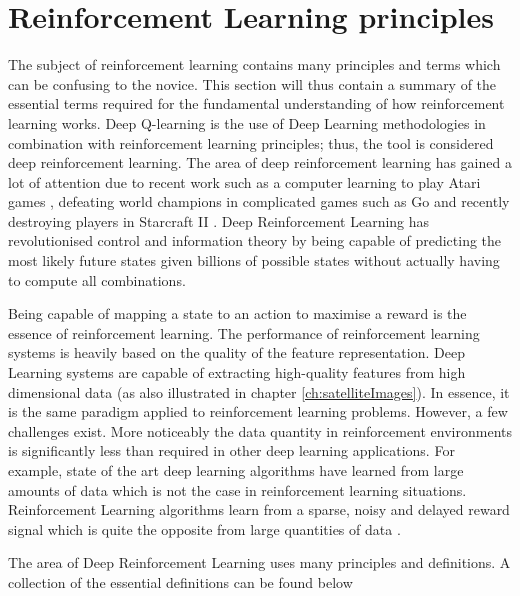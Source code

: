 \section{Reinforcement Learning principles}\label{sec:reinforcement_learning_principles}
The subject of reinforcement learning contains many principles and terms which can be confusing to the novice. This section will thus contain a summary of the essential terms required for the fundamental understanding of how reinforcement learning works. Deep Q-learning is the use of Deep Learning methodologies in combination with reinforcement learning principles; thus, the tool is considered deep reinforcement learning. The area of deep reinforcement learning has gained a lot of attention due to recent work such as a computer learning to play Atari games \cite{MnihPlayingLearning}, defeating world champions in complicated games such as Go \cite{Silver2016MasteringSearch} and recently destroying players in Starcraft II \cite{Vinyals2019GrandmasterLearning}. Deep Reinforcement Learning has revolutionised control and information theory by being capable of predicting the most likely future states given billions of possible states without actually having to compute all combinations.

Being capable of mapping a state to an action to maximise a reward is the essence of reinforcement learning. The performance of reinforcement learning systems is heavily based on the quality of the feature representation. Deep Learning systems are capable of extracting high-quality features from high dimensional data (as also illustrated in chapter \ref{ch:satelliteImages}). In essence, it is the same paradigm applied to reinforcement learning problems. However, a few challenges exist. More noticeably the data quantity in reinforcement environments is significantly less than required in other deep learning applications. For example, state of the art deep learning algorithms have learned from large amounts of data which is not the case in reinforcement learning situations. Reinforcement Learning algorithms learn from a sparse, noisy and delayed reward signal which is quite the opposite from large quantities of data \cite{Sutton2017ReinforcementSecond}. 

The area of Deep Reinforcement Learning uses many principles and definitions. A collection of the essential definitions can be found below



